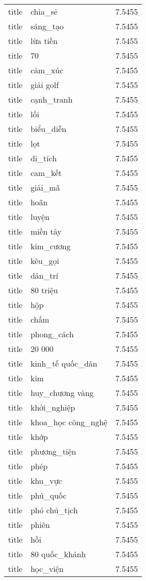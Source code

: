 \documentclass{article}
\begin{document}
\begin{tabular}{lll}
title & chia\_sẻ & 7.5455\\
title & sáng\_tạo & 7.5455\\
title & lừa tiền & 7.5455\\
title & 70 & 7.5455\\
title & cảm\_xúc & 7.5455\\
title & giải golf & 7.5455\\
title & cạnh\_tranh & 7.5455\\
title & lối & 7.5455\\
title & biểu\_diễn & 7.5455\\
title & lọt & 7.5455\\
title & di\_tích & 7.5455\\
title & cam\_kết & 7.5455\\
title & giải\_mã & 7.5455\\
title & hoãn & 7.5455\\
title & luyện & 7.5455\\
title & miền tây & 7.5455\\
title & kim\_cương & 7.5455\\
title & kêu\_gọi & 7.5455\\
title & dân\_trí & 7.5455\\
title & 80 triệu & 7.5455\\
title & hộp & 7.5455\\
title & chấm & 7.5455\\
title & phong\_cách & 7.5455\\
title & 20 000 & 7.5455\\
title & kinh\_tế quốc\_dân & 7.5455\\
title & kim & 7.5455\\
title & huy\_chương vàng & 7.5455\\
title & khởi\_nghiệp & 7.5455\\
title & khoa\_học công\_nghệ & 7.5455\\
title & khớp & 7.5455\\
title & phương\_tiện & 7.5455\\
title & phép & 7.5455\\
title & khu\_vực & 7.5455\\
title & phú\_quốc & 7.5455\\
title & phó chủ\_tịch & 7.5455\\
title & phiên & 7.5455\\
title & hồi & 7.5455\\
title & 80 quốc\_khánh & 7.5455\\
title & học\_viện & 7.5455\\

\end{tabular}
\end{document}
